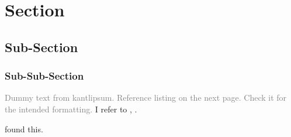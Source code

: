 \documentclass{article}
\begin{document}
\section{Section}
\subsection{Sub-Section}
\subsubsection{Sub-Sub-Section}

\textcolor{gray}{Dummy text from kantlipsum. Reference listing on the next page. Check it for the intended formatting.} I refer to \cite{butin2009education}, \cite{rudestam2014surviving, Goossens2008g,cassuto2010advising,pires2021teens}. \kant[9] 

\cite{rudestam2014surviving} found this. \cite{rudestam2014surviving, Goossens2008g,cassuto2010advising}



\end{document}
